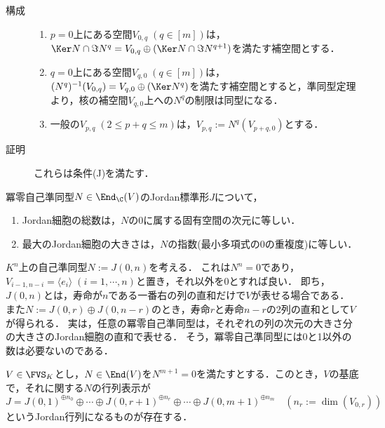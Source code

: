 \documentclass[uplatex, dvipdfmx]{jsreport}
\begin{document}
\begin{Proof}\mbox{}
    \begin{description}
        \item[構成] 
        \begin{enumerate}
            \item $p=0$上にある空間$V_{0,q}\;(q\in[m])$は，$\Ker N\cap\Im N^q=V_{0,q}\oplus(\Ker N\cap\Im N^{q+1})$を満たす補空間とする．
            \item $q=0$上にある空間$V_{q,0}\;(q\in[m])$は，$(N^q)^{-1}(V_{0,q})=V_{q,0}\oplus(\Ker N^q)$を満たす補空間とすると，準同型定理より，核の補空間$V_{q,0}$上への$N^q$の制限は同型になる．
            \item 一般の$V_{p,q}\;(2\le p+q\le m)$は，$V_{p,q}:=N^q(V_{p+q,0})$とする．
        \end{enumerate}
        \item[証明] これらは条件(J)を満たす．
    \end{description}
\end{Proof}

\begin{corollary}
    冪零自己準同型$N\in\End_\C(V)$のJordan標準形$J$について，
    \begin{enumerate}
        \item Jordan細胞の総数は，$N$の$0$に属する固有空間の次元に等しい．
        \item 最大のJordan細胞の大きさは，$N$の指数(最小多項式の$0$の重複度)に等しい．
    \end{enumerate}
\end{corollary}

\begin{example}[$J(0,n)$の場合]
    $K^n$上の自己準同型$N:=J(0,n)$を考える．
    これは$N^n=0$であり，$V_{i-1,n-i}=\langle e_i\rangle\;(i=1,\cdots,n)$と置き，それ以外を$0$とすれば良い．
    即ち，$J(0,n)$とは，寿命が$n$である一番右の列の直和だけで$V$が表せる場合である．
    また$N:=J(0,r)\oplus J(0,n-r)$のとき，寿命$r$と寿命$n-r$の2列の直和として$V$が得られる．
    実は，任意の冪零自己準同型は，それぞれの列の次元の大きさ分の大きさのJordan細胞の直和で表せる．
    そう，冪零自己準同型には0と1以外の数は必要ないのである．
\end{example}

\begin{corollary}[冪零準同型のJordan標準形]\label{cor-Jordan-form-of-nilpotents}
    $V\in\FVS_K$とし，$N\in\End(V)$を$N^{m+1}=0$を満たすとする．このとき，$V$の基底で，それに関する$N$の行列表示が
    \[J=J(0,1)^{\oplus n_0}\oplus\cdots\oplus J(0,r+1)^{\oplus n_r}\oplus\cdots\oplus J(0,m+1)^{\oplus n_m}\quad(n_r:=\dim(V_{0,r}))\]
    というJordan行列になるものが存在する．
\end{corollary}
\end{document}
